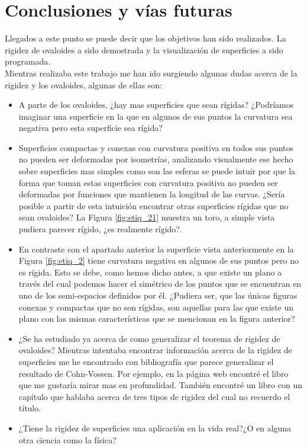 \chapter{Conclusiones y vías futuras}

Llegados a este punto se puede decir que los objetivos han sido realizados. La rigidez de ovaloides a sido demostrada y la visualización de superficies a sido programada.
${ }$\\

Mientras realizaba este trabajo me han ido surgiendo algunas dudas acerca de la rigidez y los ovaloides, algunas de ellas son: 
${ }$\\

\begin{itemize}
	\item A parte de los ovaloides, ¿hay mas superficies que sean rígidas? ¿Podríamos imaginar una superficie en la que en algunos de sus puntos la curvatura sea negativa pero esta superficie sea rígida?
	
	\item Superficies compactas y conexas con curvatura positiva en todos sus puntos no pueden ser deformadas por isometrías, analizando visualmente ese hecho sobre superficies mas simples como son las esferas se puede intuir por que la forma que toman estas superficies con curvatura positiva no pueden ser deformadas por funciones que mantienen la longitud de las curvas. ¿Sería posible a partir de esta intuición encontrar otras superficies rígidas que no sean ovaloides? La Figura \ref{fig:etiq_21} muestra un toro, a simple vista pudiera parecer rígido, ¿es realmente rígido?.
	
	\item En contraste con el apartado anterior la superficie vista anteriormente en la Figura \ref{fig:etiq_2} tiene curvatura negativa en algunos de sus puntos pero no es rígida. Esto se debe, como hemos dicho antes, a que existe un plano a través del cual podemos hacer el simétrico de los puntos que se encuentran en uno de los semi-espacios definidos por él. ¿Pudiera ser, que las únicas figuras conexas y compactas que no son rígidas, son aquellas para las que existe un plano con las mismas características que se mencionan en la figura anterior?
	
	\item ¿Se ha estudiado ya acerca de como generalizar el teorema de rigidez de ovaloides? Mientras intentaba encontrar información acerca de la rigidez de superficies me he encontrado con bibliografía que parece generalizar el resultado de Cohn-Vossen. Por ejemplo, en la página web \cite{ref7} encontré el libro \cite{math1} que me gustaría mirar mas en profundidad. También encontré un libro con un capítulo que hablaba acerca de tres tipos de rigidez del cual no recuerdo el título.
	
	\item ¿Tiene la rigidez de superficies una aplicación en la vida real?¿O en alguna otra ciencia como la física?
\end{itemize}
${ }$\\

